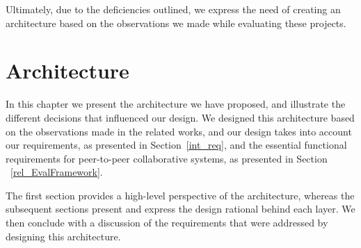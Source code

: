 \documentclass[12pt, titlepage]{uo_temp}
\begin{document}
     Ultimately, due to the deficiencies outlined, we express the need of creating an
     architecture based on the observations we made while evaluating these projects.

     \chapter{Architecture}\label{arch_chap}
     In this chapter we present the architecture we have proposed, and illustrate the
     different decisions that influenced our design. We designed this architecture based
     on the observations made in the related works, and our design takes into account our
     requirements, as presented in Section~\ref{int_req}, and the essential functional
     requirements for peer-to-peer collaborative systems, as presented in Section
     ~\ref{rel_EvalFramework}.

     The first section provides a high-level perspective of the architecture, whereas the
     subsequent sections present and express the design rational behind each layer. We
     then conclude with a discussion of the requirements that were addressed by designing
     this architecture.
\end{document}
